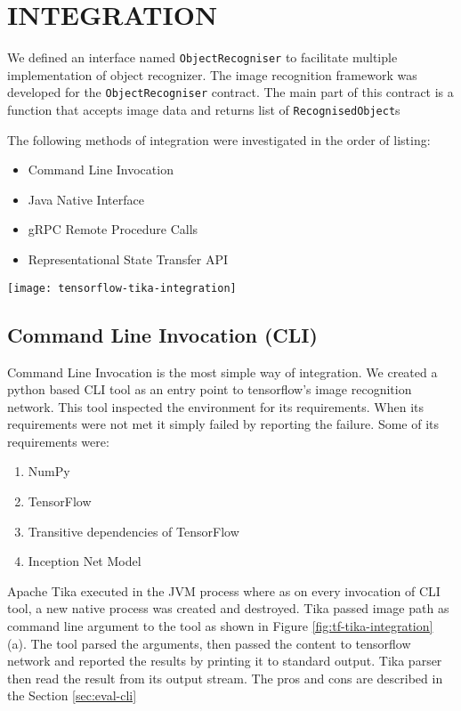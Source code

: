 \section{INTEGRATION} \label{sec:integration}
We defined an interface named \texttt{ObjectRecogniser} to facilitate multiple implementation of object recognizer. The image recognition framework was developed for the \texttt{ObjectRecogniser} contract. The main part of this contract is a function that accepts image data and returns list of \texttt{RecognisedObject}s

The following methods of integration were investigated in the order of listing:
\begin{itemize}
\item Command Line Invocation
\item Java Native Interface
\item gRPC Remote Procedure Calls
\item Representational State Transfer API
\end{itemize}

\begin{figure*}
	\texttt{[image: tensorflow-tika-integration]}
	\caption{Tika and Tensorflow Integration}
	\label{fig:tf-tika-integration}
\end{figure*}

\subsection{Command Line Invocation (CLI)} \label{sec:int-cli}
Command Line Invocation is the most simple way of integration. We created a python based CLI tool as an entry point to tensorflow's image recognition network. This tool inspected the environment for its requirements. When its requirements were not met it simply failed by reporting the failure. Some of its requirements were:
\begin{enumerate}
\item NumPy
\item TensorFlow
\item Transitive dependencies of TensorFlow
\item Inception Net Model
\end{enumerate}
Apache Tika executed in the JVM process where as on every invocation of CLI tool, a new native process was created and destroyed. Tika passed image path as command line argument to the tool as shown in Figure \ref{fig:tf-tika-integration} (a). The tool parsed the arguments, then passed the content to tensorflow network and reported the results by printing it to standard output. Tika parser then read the result from its output stream. The pros and cons are described in the Section \ref{sec:eval-cli}

